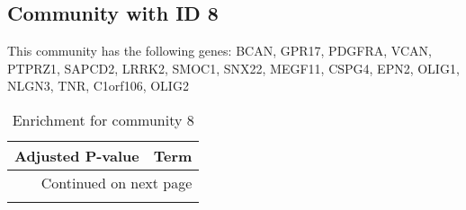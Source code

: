 \subsection*{Community with ID 8}
This community has the following genes: BCAN, GPR17, PDGFRA, VCAN, PTPRZ1, SAPCD2, LRRK2, SMOC1, SNX22, MEGF11, CSPG4, EPN2, OLIG1, NLGN3, TNR, C1orf106, OLIG2
\\
\begin{longtable}{p{2.4cm}p{14.5cm}}
\caption{Enrichment for community 8}\\
\toprule
Adjusted \newline P-value &                                                                                        Term \\
\midrule
\endhead
\midrule
\multicolumn{2}{r}{{Continued on next page}} \\
\midrule
\endfoot


\end{longtable}
